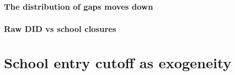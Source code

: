 \documentclass{beamer}
\begin{document}
\begin{frame}
    \label{update_scott}
    \frametitle{The distribution of gaps moves down}
        {
    }
\end{frame}


\begin{frame}
    \label{update_scott}
    \frametitle{Raw DID vs school closures}
        {
    }
\end{frame}







\section{School entry cutoff as exogeneity}
\end{document}

